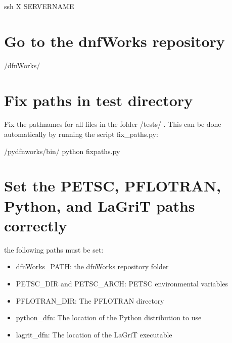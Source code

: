 \documentclass[letterpaper,10pt,english]{sphinxmanual}
\begin{document}
%
\begin{sphinxVerbatim}[commandchars=\\\{\}]
\PYGZdl{} ssh \PYGZhy{}X SERVER\PYGZus{}NAME
\end{sphinxVerbatim}


\section{Go to the dnfWorks repository}
\label{\detokenize{tutorial:go-to-the-dnfworks-repository}}
%
\begin{sphinxVerbatim}[commandchars=\\\{\}]
\PYGZdl{}  \PYGZti{}/dfnWorks/
\end{sphinxVerbatim}


\section{Fix paths in test directory}
\label{\detokenize{tutorial:fix-paths-in-test-directory}}
Fix the pathnames for all files in the folder /tests/ . This can be done automatically by running the script fix\_paths.py:

%
\begin{sphinxVerbatim}[commandchars=\\\{\}]
\PYGZdl{}  /pydfnworks/bin/
\PYGZdl{} python fix\PYGZus{}paths.py
\end{sphinxVerbatim}


\section{Set the PETSC, PFLOTRAN, Python, and LaGriT paths correctly}
\label{\detokenize{tutorial:set-the-petsc-pflotran-python-and-lagrit-paths-correctly}}
 the following paths must be set:
\begin{itemize}
\item {} 
dfnWorks\_PATH: the dfnWorks repository folder

\item {} 
PETSC\_DIR and PETSC\_ARCH: PETSC environmental variables

\item {} 
PFLOTRAN\_DIR: The PFLOTRAN directory

\item {} 
python\_dfn: The location of the Python distribution to use

\item {} 
lagrit\_dfn: The location of the LaGriT executable

\end{itemize}
\end{document}
